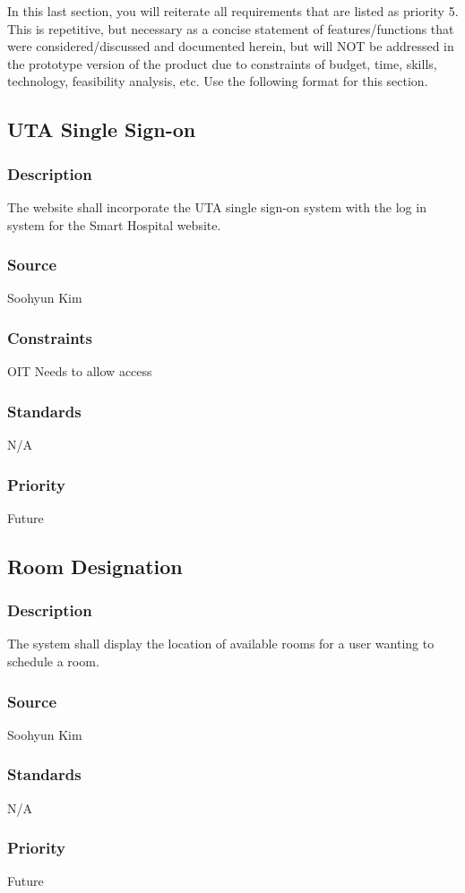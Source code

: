 In this last section, you will reiterate all requirements that are listed as priority 5. This is repetitive, but necessary as a concise statement of features/functions that were considered/discussed and documented herein, but will NOT be addressed in the prototype version of the product due to constraints of budget, time, skills, technology, feasibility analysis, etc. Use the following format for this section.

\subsection{UTA Single Sign-on}
\subsubsection{Description}
The website shall incorporate the UTA single sign-on system with the log in system for the Smart Hospital website.
\subsubsection{Source}
Soohyun Kim
\subsubsection{Constraints}
OIT Needs to allow access
\subsubsection{Standards}
N/A
\subsubsection{Priority}
Future

\subsection{Room Designation}
\subsubsection{Description}
The system shall display the location of available rooms for a user wanting to schedule a room.
\subsubsection{Source}
Soohyun Kim
\subsubsection{Standards}
N/A
\subsubsection{Priority}
Future